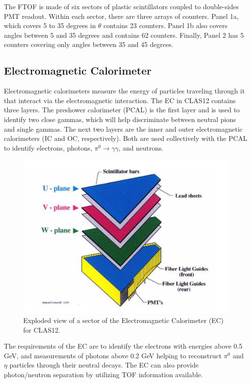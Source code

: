 The FTOF is made of six sectors of plastic scintillators coupled to double-sides PMT readout. Within each sector, there are three arrays of counters. Panel 1a, which covers 5 to 35 degrees in $\theta$ contains 23 counters. Panel 1b also covers angles between 5 and 35 degrees and contains 62 counters. Finally, Panel 2 has 5 counters covering only angles between 35 and 45 degrees. 

\subsection{Electromagnetic Calorimeter}
Electromagnetic calorimeters measure the energy of particles traveling through it that interact via the electromagnetic interaction. The EC in CLAS12 contains three layers. The preshower calorimeter (PCAL) is the first layer and is used to identify two close gammas, which will help discriminate between neutral pions and single gammas. The next two layers are the inner and outer electromagnetic calorimeters (IC and OC, respectively). Both are used collectively with the PCAL to identify electrons, photons, $\pi^0 \rightarrow \gamma \gamma$, and neutrons.

\begin{figure}[h!]
	\centering
	\includegraphics[width=0.8\linewidth]{figures/ecal.png}
	\caption{Exploded view of a sector of the Electromagnetic Calorimeter (EC) for CLAS12. \cite{clasnote:EC_geo} }
	\label{fig:ecal}
\end{figure}

The requirements of the EC are to identify the electrons with energies above 0.5 GeV, and measurements of photons above 0.2 GeV helping to reconstruct $\pi^0$ and $\eta$ particles through their neutral decays. The EC can also provide photon/neutron separation by utilizing TOF information available.

